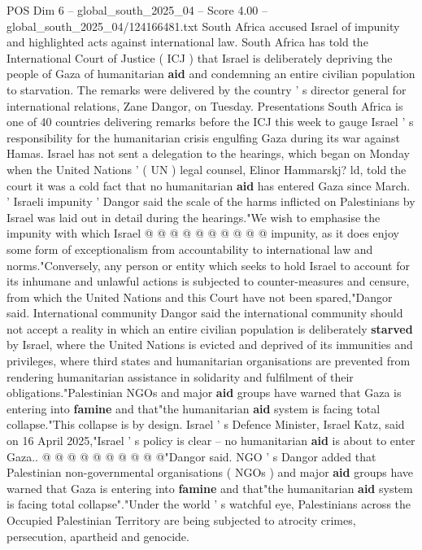 \begin{textsample}{POS Dim 6 – global\_south\_2025\_04 – Score 4.00 – global\_south\_2025\_04/124166481.txt}  \label{ex:f6_pos_236}
South Africa accused Israel of impunity and highlighted acts against international law.
South Africa has told the International Court of Justice ( ICJ ) that Israel is deliberately depriving the people of Gaza of humanitarian \textbf{aid} and condemning an entire civilian population to starvation.
The remarks were delivered by the country ' s director general for international relations, Zane Dangor, on Tuesday.
Presentations South Africa is one of 40 countries delivering remarks before the ICJ this week to gauge Israel ' s responsibility for the humanitarian crisis engulfing Gaza during its war against Hamas.
Israel has not sent a delegation to the hearings, which began on Monday when the United Nations ' ( UN ) legal counsel, Elinor Hammarskj? ld, told the court it was a cold fact that no humanitarian \textbf{aid} has entered Gaza since March. ' Israeli impunity ' Dangor said the scale of the harms inflicted on Palestinians by Israel was laid out in detail during the hearings."We wish to emphasise the impunity with which Israel @ @ @ @ @ @ @ @ @ @ impunity, as it does enjoy some form of exceptionalism from accountability to international law and norms."Conversely, any person or entity which seeks to hold Israel to account for its inhumane and unlawful actions is subjected to counter-measures and censure, from which the United Nations and this Court have not been spared,"Dangor said.
International community Dangor said the international community should not accept a reality in which an entire civilian population is deliberately \textbf{starved} by Israel, where the United Nations is evicted and deprived of its immunities and privileges, where third states and humanitarian organisations are prevented from rendering humanitarian assistance in solidarity and fulfilment of their obligations."Palestinian NGOs and major \textbf{aid} groups have warned that Gaza is entering into \textbf{famine} and that"the humanitarian \textbf{aid} system is facing total collapse."This collapse is by design.
Israel ' s Defence Minister, Israel Katz, said on 16 April 2025,"Israel ' s policy is clear -- no humanitarian \textbf{aid} is about to enter Gaza.. @ @ @ @ @ @ @ @ @ @"Dangor said.
NGO ' s Dangor added that Palestinian non-governmental organisations ( NGOs ) and major \textbf{aid} groups have warned that Gaza is entering into \textbf{famine} and that"the humanitarian \textbf{aid} system is facing total collapse"."Under the world ' s watchful eye, Palestinians across the Occupied Palestinian Territory are being subjected to atrocity crimes, persecution, apartheid and genocide.

\end{textsample}
